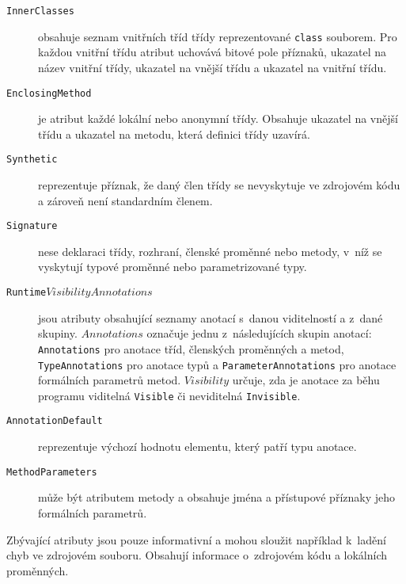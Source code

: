 \begin{description}

\item [\texttt{InnerClasses}] obsahuje seznam vnitřních tříd třídy reprezentované \texttt{class} souborem. Pro každou vnitřní třídu atribut uchovává bitové pole příznaků, ukazatel na název vnitřní třídy, ukazatel na vnější třídu a ukazatel na vnitřní třídu.

\item [\texttt{EnclosingMethod}] je atribut každé lokální nebo anonymní třídy. Obsahuje ukazatel na vnější třídu a ukazatel na metodu, která definici třídy uzavírá.

\item [\texttt{Synthetic}] reprezentuje příznak, že daný člen třídy se nevyskytuje ve zdrojovém kódu a zároveň není standardním členem.

\item [\texttt{Signature}] nese deklaraci třídy, rozhraní, členské proměnné nebo metody, v~níž se vyskytují typové proměnné nebo parametrizované typy.

\item [\texttt{Runtime}$Visibility$$Annotations$] jsou atributy obsahující seznamy anotací s~danou viditelností a z~dané skupiny. $Annotations$ označuje jednu z~následujících skupin anotací: \texttt{Annotations} pro anotace tříd, členských proměnných a metod, \texttt{TypeAnnotations} pro anotace typů a \texttt{ParameterAnnotations} pro anotace formálních parametrů metod. $Visibility$ určuje, zda je anotace za běhu programu viditelná \texttt{Visible} či neviditelná \texttt{Invisible}. 

\item [\texttt{AnnotationDefault}] reprezentuje výchozí hodnotu elementu, který patří typu anotace.

\item [\texttt{MethodParameters}] může být atributem metody a obsahuje jména a přístupové příznaky jeho formálních parametrů.
\end{description}

Zbývající atributy jsou pouze informativní a mohou sloužit například k~ladění chyb ve zdrojovém souboru. Obsahují informace o~zdrojovém kódu a lokálních proměnných.

